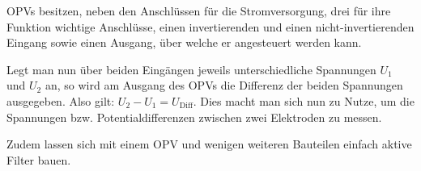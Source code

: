 \documentclass[10pt]{article}
\begin{document}
OPVs besitzen, neben den Anschlüssen für die Stromversorgung, drei für ihre Funktion wichtige Anschlüsse, einen invertierenden und einen nicht-invertierenden Eingang sowie einen Ausgang, über welche er angesteuert werden kann.

Legt man nun über beiden Eingängen jeweils unterschiedliche Spannungen $U_{1}$ und $U_{2}$ an, so wird am Ausgang des OPVs die Differenz der beiden Spannungen ausgegeben. Also gilt: $U_{2} - U_{1} = U_{\textrm{Diff}}$. 
Dies macht man sich nun zu Nutze, um die Spannungen bzw. Potentialdifferenzen zwischen zwei Elektroden zu messen. 

Zudem lassen sich mit einem OPV und wenigen weiteren Bauteilen einfach aktive Filter bauen.
\end{document}

